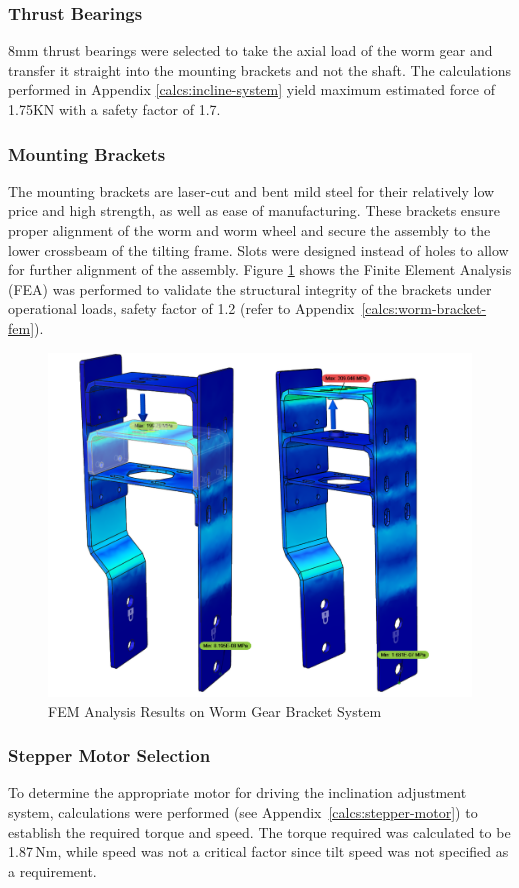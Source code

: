 \subsubsection{Thrust Bearings}
8mm thrust bearings were selected to take the axial load of the worm gear and transfer it straight into the mounting brackets and not the shaft. The calculations performed in Appendix \ref{calcs:incline-system} yield maximum estimated force of 1.75KN with a safety factor of 1.7.


\subsubsection{Mounting Brackets}

The mounting brackets are laser-cut and bent mild steel for their relatively low price and high strength, as well as ease of manufacturing. These brackets ensure proper alignment of the worm and worm wheel and secure the assembly to the lower crossbeam of the tilting frame. Slots were designed instead of holes to allow for further alignment of the assembly. Figure \ref{fig:FEM-incline-brackets} shows the Finite Element Analysis (FEA) was performed to validate the structural integrity of the brackets under operational loads, safety factor of 1.2 (refer to Appendix~\ref{calcs:worm-bracket-fem}).

\begin{figure}[H]
    \centering
    \includegraphics[width=0.6\linewidth]{figs/FEM/incline-braket.png}
    \caption{FEM Analysis Results on Worm Gear Bracket System}
    \label{fig:FEM-incline-brackets}
\end{figure}

\subsubsection{Stepper Motor Selection}
To determine the appropriate motor for driving the inclination adjustment system, calculations were performed (see Appendix~\ref{calcs:stepper-motor}) to establish the required torque and speed. The torque required was calculated to be 1.87\,Nm, while speed was not a critical factor since tilt speed was not specified as a requirement. 

